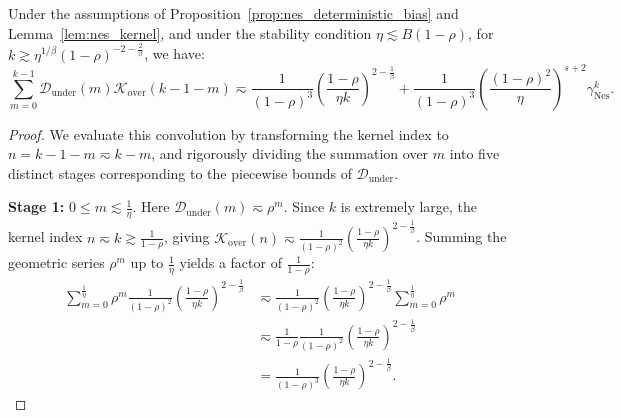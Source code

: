 \begin{lemma}
\label{lem:nes_conv_under_over}
Under the assumptions of Proposition~\ref{prop:nes_deterministic_bias} and Lemma~\ref{lem:nes_kernel}, and under the stability condition $\eta\lesssim B(1-\rho)$, for $k \gtrsim \eta^{1/\beta}(1-\rho)^{-2-\frac{2}{\beta}}$, we have:
\begin{equation*}
    \sum_{m=0}^{k-1} \mathcal{D}_{\mathrm{under}}(m) \mathcal{K}_{\mathrm{over}}(k-1-m) \eqsim \frac{1}{(1-\rho)^3} \left(\frac{1-\rho}{\eta k}\right)^{2-\frac{1}{\beta}} + \frac{1}{(1-\rho)^3} \left(\frac{(1-\rho)^2}{\eta}\right)^{s+2} \gamma_{\mathrm{Nes}}^k.
\end{equation*}
\end{lemma}
\begin{proof}
We evaluate this convolution by transforming the kernel index to $n = k-1-m \eqsim k-m$, and rigorously dividing the summation over $m$ into five distinct stages corresponding to the piecewise bounds of $\mathcal{D}_{\mathrm{under}}$.

\textbf{Stage 1:} $0 \le m \lesssim \frac{1}{\eta}$. 
Here $\mathcal{D}_{\mathrm{under}}(m) \eqsim \rho^m$. Since $k$ is extremely large, the kernel index $n \eqsim k \gtrsim \frac{1}{1-\rho}$, giving $\mathcal{K}_{\mathrm{over}}(n) \eqsim \frac{1}{(1-\rho)^2} \left(\frac{1-\rho}{\eta k}\right)^{2-\frac{1}{\beta}}$. 
Summing the geometric series $\rho^m$ up to $\frac{1}{\eta}$ yields a factor of $\frac{1}{1-\rho}$:
\begin{align*}
    \sum_{m=0}^{\frac{1}{\eta}} \rho^m \frac{1}{(1-\rho)^2} \left(\frac{1-\rho}{\eta k}\right)^{2-\frac{1}{\beta}} 
    &\eqsim \frac{1}{(1-\rho)^2} \left(\frac{1-\rho}{\eta k}\right)^{2-\frac{1}{\beta}} \sum_{m=0}^{\frac{1}{\eta}} \rho^m \\
    &\eqsim \frac{1}{1-\rho} \frac{1}{(1-\rho)^2} \left(\frac{1-\rho}{\eta k}\right)^{2-\frac{1}{\beta}}\\
    &= \frac{1}{(1-\rho)^3} \left(\frac{1-\rho}{\eta k}\right)^{2-\frac{1}{\beta}}.
\end{align*}


\end{proof}
